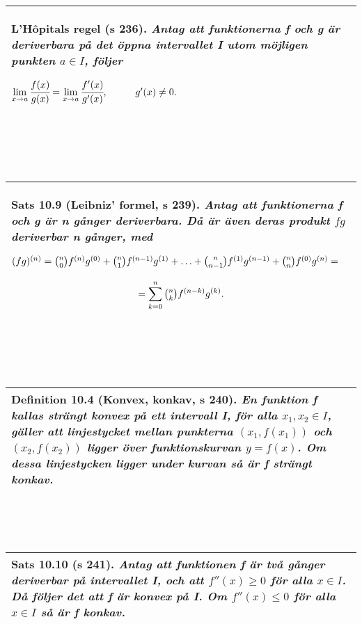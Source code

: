 \documentclass[a4paper]{article}
\begin{document}
\\\\\\
\begin{tabular}{|L{11.5cm}|} \hline
\textbf{L'Hôpitals regel} (s 236).
\textit{Antag att funktionerna f och g är deriverbara på det öppna intervallet I utom möjligen punkten $a \in I$, följer}
\begin{center}
$\lim\limits_{x\rightarrow a}\cfrac{f(x)}{g(x)}=\lim\limits_{x\rightarrow a}\cfrac{f'(x)}{g'(x)}, \hspace{1cm} g'(x)\neq 0.$
\end{center}
\\\hline
\end{tabular}
\\\\\\
\begin{tabular}{|L{11.5cm}|} \hline
\textbf{Sats 10.9} (Leibniz' formel, s 239).
\textit{Antag att funktionerna f och g är n gånger deriverbara. Då är även deras produkt $fg$ deriverbar n gånger, med}
\begin{center}
$(fg)^{(n)}=
\tbinom{n}{0}f^{(n)}g^{(0)} + 
\tbinom{n}{1}f^{(n-1)}g^{(1)} +
\ldots +
\tbinom{n}{n-1}f^{(1)}g^{(n-1)} +
\tbinom{n}{n}f^{(0)}g^{(n)} =$
\end{center}
\begin{displaymath}
=\sum_{k=0}^{n}\tbinom{n}{k}f^{(n-k)}g^{(k)}.
\end{displaymath}
\\\hline
\end{tabular}
\\\\\\
\begin{tabular}{|L{11.5cm}|} \hline
\textbf{Definition 10.4} (Konvex, konkav, s 240).
\textit{En funktion f kallas \textbf{strängt konvex} på ett intervall I, för alla $x_1,x_2\in I$, gäller att linjestycket mellan punkterna $(x_1,f(x_1))$ och $(x_2,f(x_2))$ ligger över funktionskurvan $y=f(x)$. Om dessa linjestycken ligger under kurvan så är f \textbf{strängt konkav}.}
\\\hline
\end{tabular}
\\\\\\
\begin{tabular}{|L{11.5cm}|} \hline
\textbf{Sats 10.10} (s 241).
\textit{Antag att funktionen f är två gånger deriverbar på intervallet I, och att $f''(x)\geq 0$ för alla $x\in I$. Då följer det att f är konvex på I. Om $f''(x)\leq 0$ för alla $x\in I$ så är f konkav.}
\\\hline
\end{tabular}
\end{document}

